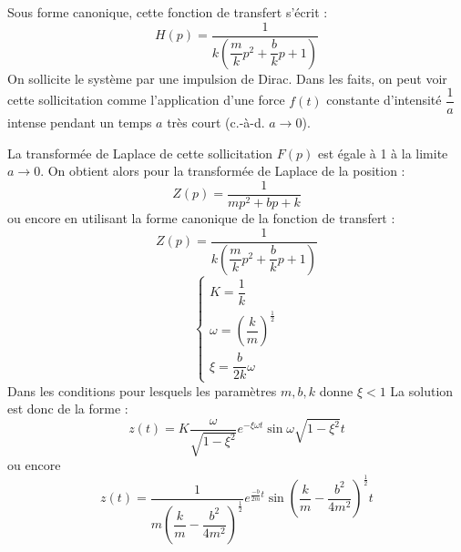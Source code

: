 Sous forme canonique, cette fonction de transfert s'écrit :
\[
    H(p)=\dfrac{1}{k\left(\dfrac{m}{k}p^2+\dfrac{b}{k}p+1\right)}
\]
On sollicite le système par une impulsion de Dirac. Dans les faits, on peut 
voir cette sollicitation comme l'application d'une force $f(t)$ constante 
d'intensité $\dfrac{1}{a}$ intense pendant un temps $a$ très court 
(c.-à-d. $a\to0$).    

La transformée de Laplace de cette sollicitation $F(p)$ est égale à 1 à 
la limite $a\to0$. On obtient alors pour la transformée de Laplace de la 
position :
\[
    Z(p)=\dfrac{1}{mp^2+bp+k}
\]
ou encore en utilisant la forme canonique de la fonction de transfert :
\[
    Z(p)=\dfrac{1}{k\left(\dfrac{m}{k}p^2+\dfrac{b}{k}p+1\right)}
\]
\[
    \begin{cases}
        K=\dfrac{1}{k}\\[1.5em]
        \omega=\left(\dfrac{k}{m}\right)^{\frac{1}{2}}\\[1.5em]
        \xi=\dfrac{b}{2k}\omega
    \end{cases}
\]
Dans les conditions pour lesquels les paramètres $m, b ,k$ donne $\xi<1$ 
La solution est donc de la forme :
\[
    z(t)=K\dfrac{\omega}{\sqrt{1-\xi^2}}
         e^{-\xi\omega t}\sin{\omega\sqrt{1-\xi^2} t} 
\]
ou encore 
\[
    z(t)=\dfrac{1}{m\left(\dfrac{k}{m}-\dfrac{b^2}{4m^2}\right)^{\frac{1}{2}}}
         e^{\frac{-b}{2m}t}\sin{\left(\dfrac{k}{m}-\dfrac{b^2}{4m^2}\right)^
         {\frac{1}{2}}t}
\]

